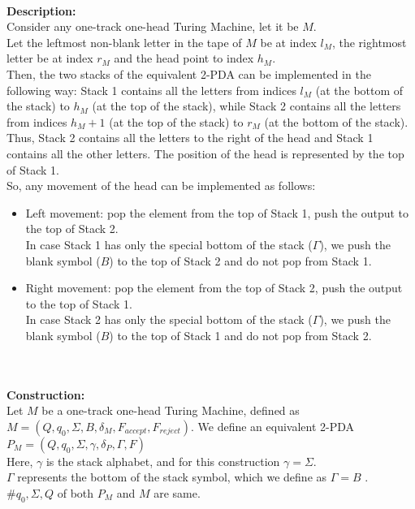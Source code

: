 \documentclass[12pt,a4paper]{article}
\begin{document}
\\ \textbf{Description:}
\\Consider any one-track one-head Turing Machine, let it be $M$.
\\Let the leftmost non-blank letter in the tape of $M$ be at index $l_M$, the rightmost letter be at index $r_M$ and the head point to index $h_M$.
\\Then, the two stacks of the equivalent 2-PDA can be implemented in the following way: Stack 1 contains all the letters from indices $l_M$ (at the bottom of the stack) to $h_M$ (at the top of the stack), while Stack 2 contains all the letters from indices $h_M + 1$ (at the top of the stack) to $r_M$ (at the bottom of the stack).
\\Thus, Stack 2 contains all the letters to the right of the head and Stack 1 contains all the other letters. The position of the head is represented by the top of Stack 1.
\\So, any movement of the head can be implemented as follows:
\begin{itemize}
    \item Left movement: pop the element from the top of Stack 1, push the output to the top of Stack 2.
    \\In case Stack 1 has only the special bottom of the stack ($\Gamma$), we push the blank symbol ($B$) to the top of Stack 2 and do not pop from Stack 1.
    \item Right movement: pop the element from the top of Stack 2, push the output to the top of Stack 1.
    \\In case Stack 2 has only the special bottom of the stack ($\Gamma$), we push the blank symbol ($B$) to the top of Stack 1 and do not pop from Stack 2. 
\end{itemize}
\\
\\ \textbf{Construction:}
\\Let $M$ be a one-track one-head Turing Machine, defined as $M = (Q,q_0,\Sigma,B,\delta_M,F_{accept},F_{reject})$. We define an equivalent 2-PDA $P_M = (Q,q_0,\Sigma,\gamma,\delta_P,\Gamma,F)$
\\Here, $\gamma$ is the stack alphabet, and for this construction $\gamma = \Sigma$.
\\ $\Gamma$ represents the bottom of the stack symbol, which we define as $\Gamma = B$ .
\\ #$q_0, \Sigma, Q$ of both $P_M$ and $M$ are same.
\end{document}
